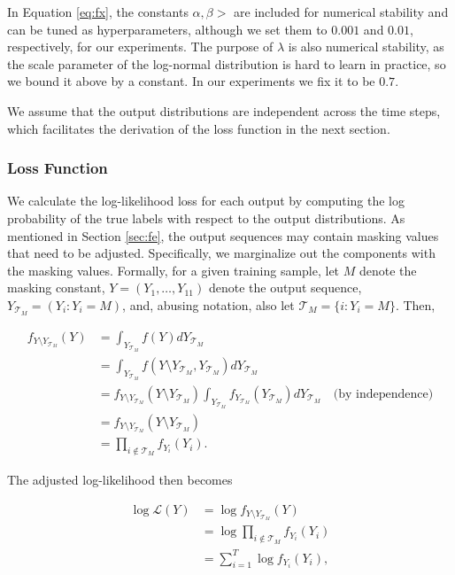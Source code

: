 \documentclass{article}
\begin{document}
In Equation \ref{eq:fx}, the constants $\alpha, \beta > $ are included for numerical stability and can be tuned as hyperparameters, although we set them to $0.001$ and $0.01$, respectively, for our experiments. The purpose of $\lambda$ is also numerical stability, as the scale parameter of the log-normal distribution is hard to learn in practice, so we bound it above by a constant. In our experiments we fix it to be $0.7$.

We assume that the output distributions are independent across the time steps, which facilitates the derivation of the loss function in the next section.

\subsubsection{Loss Function}\label{sec:loss-function}

We calculate the log-likelihood loss for each output by computing the log probability of the true labels with respect to the output distributions. As mentioned in Section \ref{sec:fe}, the output sequences may contain masking values that need to be adjusted. Specifically, we marginalize out the components with the masking values. Formally, for a given training sample, let $M$ denote the masking constant, $Y=(Y_1,\dots,Y_{11})$ denote the output sequence, $Y_{\mathcal{T}_M} = (Y_i: Y_i = M)$, and, abusing notation, also let $\mathcal{T}_M = \{i: Y_i = M\}$. Then,

\begin{align}
    f_{Y\setminus Y_{\mathcal{T}_M}}(Y) &= \int_{Y_{\mathcal{T}_M}} f(Y) dY_{\mathcal{T}_M}\\
         &= \int_{Y_{\mathcal{T}_M}} f(Y\setminus Y_{\mathcal{T}_M}, Y_{\mathcal{T}_M}) dY_{\mathcal{T}_M}\\
         &= f_{Y\setminus Y_{\mathcal{T}_M}}(Y\setminus Y_{\mathcal{T}_M}) \int_{Y_{\mathcal{T}_M}} f_{Y_{\mathcal{T}_M}}(Y_{\mathcal{T}_M}) dY_{\mathcal{T}_M} \quad \text{(by independence)}\\
         &= f_{Y\setminus Y_{\mathcal{T}_M}}(Y\setminus Y_{\mathcal{T}_M})\\
         &= \prod_{i \notin \mathcal{T}_M} f_{Y_i}(Y_i).
\end{align}

The adjusted log-likelihood then becomes

\begin{align}
    \log\mathcal{L}(Y) &= \log  f_{Y\setminus Y_{\mathcal{T}_M}}(Y)\\
                       &= \log \prod_{i \notin \mathcal{T}_M} f_{Y_i}(Y_i)\\
                       &= \sum_{i = 1}^{T}\log f_{Y_i}(Y_i),
\end{align}
\end{document}
